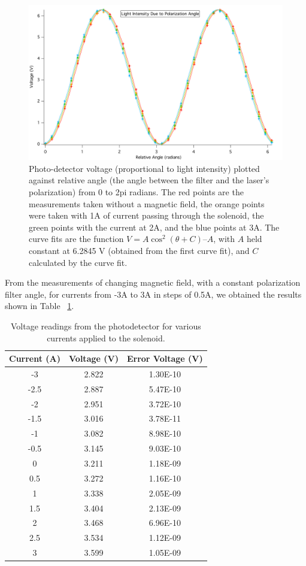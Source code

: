 \documentclass[prb,preprint]{revtex4-1}
\begin{document}
\begin{figure}[h!]
\centering
\includegraphics[width=6in]{V_ThetaRel_Plot.pdf}
\caption{Photo-detector voltage (proportional to light intensity) plotted against relative angle (the angle between the filter and the laser’s polarization) from 0 to 2pi radians.  The red points are the measurements taken without a magnetic field, the orange points were taken with 1A of current passing through the solenoid, the green points with the current at 2A, and the blue points at 3A.  The curve fits are the function $V = A \cos^{2}(\theta + C) – A$, with $A$ held constant at 6.2845 V (obtained from the first curve fit), and $C$ calculated by the curve fit. }
\label{V_ThetaRel_Plot}
\end{figure}

From the measurements of changing magnetic field, with a constant polarization filter angle, for currents from -3A to 3A in steps of 0.5A, we obtained the results shown in Table ~\ref{V_I_Table}. 

\begin{table}[h!]
\centering
\caption{Voltage readings from the photodetector for various currents applied to the solenoid. }
\begin{ruledtabular}
\begin{tabular}{c c c}
Current (A) & Voltage (V) & Error Voltage (V)\\
\hline	%
-3   & 2.822 & 1.30E-10 \\
-2.5 & 2.887 & 5.47E-10 \\
-2   & 2.951 & 3.72E-10 \\
-1.5 & 3.016 & 3.78E-11 \\
-1   & 3.082 & 8.98E-10 \\
-0.5 & 3.145 & 9.03E-10 \\
0    & 3.211 & 1.18E-09 \\
0.5  & 3.272 & 1.16E-10 \\
1    & 3.338 & 2.05E-09 \\
1.5  & 3.404 & 2.13E-09 \\
2    & 3.468 & 6.96E-10 \\
2.5  & 3.534 & 1.12E-09 \\
3    & 3.599 & 1.05E-09
\end{tabular}
\end{ruledtabular}
\label{V_I_Table}
\end{table}
\end{document}
